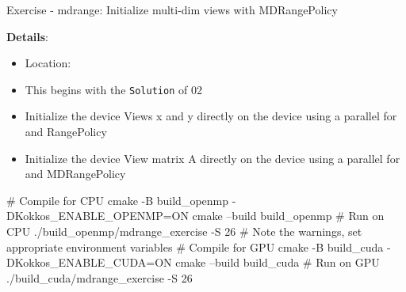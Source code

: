 
\begin{frame}[fragile]{Exercise - mdrange: Initialize multi-dim views with MDRangePolicy}

  \textbf{Details}:
  \begin{small}
  \begin{itemize}
    \item Location: 
    \item This begins with the \texttt{Solution} of 02
    \item Initialize the device Views x and y directly on the device using a parallel for and RangePolicy
    \item Initialize the device View matrix A directly on the device using a parallel for and MDRangePolicy
  \end{itemize}
  \end{small}

\begin{code}
  # Compile for CPU
  cmake -B build_openmp -DKokkos_ENABLE_OPENMP=ON
  cmake --build build_openmp
  # Run on CPU
  ./build_openmp/mdrange_exercise -S 26
  # Note the warnings, set appropriate environment variables
  # Compile for GPU
  cmake -B build_cuda -DKokkos_ENABLE_CUDA=ON
  cmake --build build_cuda
  # Run on GPU
  ./build_cuda/mdrange_exercise -S 26
\end{code}

\end{frame}


